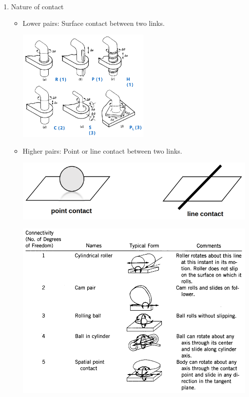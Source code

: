 \documentclass[11pt]{article}
\begin{document}
 \newpage

\begin{enumerate}
\item Nature of contact
\begin{itemize}
\item Lower pairs: Surface contact between two links.
\begin{center}
\includegraphics[height=15em]{./images/lower-pair-joints-image.png}
\end{center}

\item Higher pairs: Point or line contact between two links.
\begin{center}
\includegraphics[width=.9\linewidth]{./images/point-and-line-contact-image.png}
\end{center}
\begin{center}
\includegraphics[width=.9\linewidth]{./images/higher-pair-joints-image.png}
\end{center}
\end{itemize}
\end{enumerate}
\end{document}
